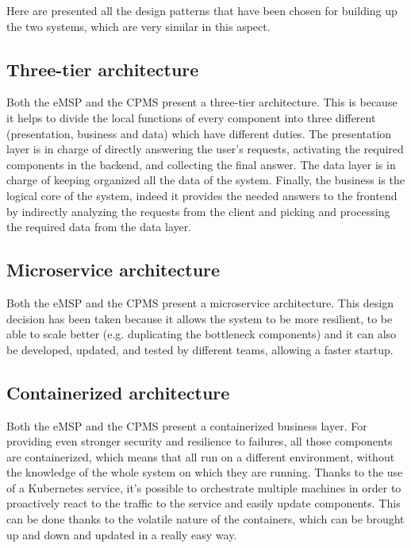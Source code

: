 Here are presented all the design patterns that have been chosen for building up the two systems, which are very similar in this aspect.

\subsection{Three-tier architecture}

Both the eMSP and the CPMS present a three-tier architecture. This is because it helps to divide the local functions of every component into three different  (presentation, business and data) which have different duties. The presentation layer is in charge of directly answering the user's requests, activating the required components in the backend, and collecting the final answer. The data layer is in charge of keeping organized all the data of the system. Finally, the business is the logical core of the system, indeed it provides the needed answers to the frontend by indirectly analyzing the requests from the client and picking and processing the required data from the data layer.

\subsection{Microservice architecture}

Both the eMSP and the CPMS present a microservice architecture. This design decision has been taken because it allows the system to be more resilient, to be able to scale better (e.g. duplicating the bottleneck components) and it can also be developed, updated, and tested by different teams, allowing a faster startup.

\subsection{Containerized architecture}

Both the eMSP and the CPMS present a containerized business layer. For providing even stronger security and resilience to failures, all those components are containerized, which means that all run on a different  environment, without the knowledge of the whole system on which they are running. Thanks to the use of a Kubernetes service, it's possible to orchestrate multiple machines in order to proactively react to the traffic to the service and easily update components. This can be done thanks to the volatile nature of the containers, which can be brought up and down and updated in a really easy way.

